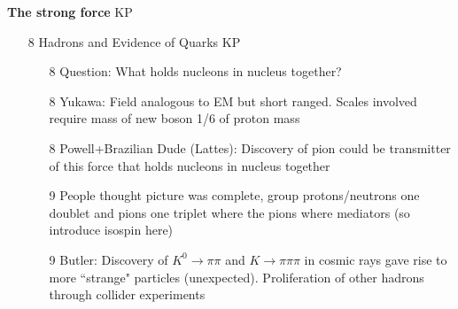 {\bf The strong force} KP
\begin{itemize}
\item[8] Hadrons and Evidence of Quarks  KP
\begin{itemize}
\item[8] Question: What holds nucleons in nucleus together?
\item[8] Yukawa: Field analogous to EM but short ranged. Scales involved require mass of new boson 1/6 of proton mass
\item[8] Powell+Brazilian Dude (Lattes): Discovery of pion could be transmitter of this force that holds nucleons in nucleus together
\item[9] People thought picture was complete, group protons/neutrons one doublet and pions one triplet 
where the pions where mediators (so introduce isospin here)
\item[9] Butler: Discovery of $K^0\to\pi\pi$ and $K\to\pi\pi\pi$ in cosmic rays gave rise to more ``strange" particles (unexpected). Proliferation of other hadrons through collider experiments
\end{itemize}


\end{itemize}
